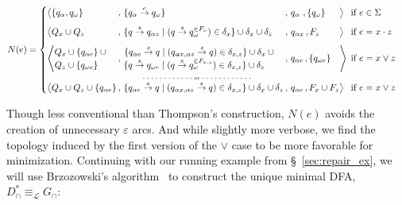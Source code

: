\documentclass[sigplan,review,acmsmall,nonacm,screen,anonymous]{acmart}\settopmatter{printfolios=false,printccs=false,printacmref=false}
\begin{document}
\begin{equation*}
N(e) =
\begin{cases}
  \begin{alignedat}{8}
    &\big\langle \{q_\alpha, q_\omega\}
    &&\,,\, \{ q_\alpha \overset{e}{\rightarrow} q_\omega \}
    &&\,,\, q_\alpha\,\,, \{q_{\omega}\}
    &&\big\rangle
    &&\:\: \text{if } e \in \Sigma \\[0.5em]

    &\big\langle Q_{x} \cup Q_{z}
    &&\,,\, \{ q \overset{s}{\rightarrow} q_{\alpha z} \mid (q \overset{s}{\rightarrow} q_{\omega}^{\in F_x}) \in \delta_x \} \cup \delta_{x} \cup \delta_{z}
    &&\,,\, q_{\alpha x}\,, F_{z}
    &&\big\rangle
    &&\:\: \text{if } e = x \cdot z \\[0.5em]

    &\Bigg\langle   \begin{matrix} Q_{x}\cup \{q_{\alpha e}\}\:\cup\\ Q_{z} \cup \{q_{\omega e}\}\phantom{\:\cup} \end{matrix}
    &&\,,\, \begin{matrix}\{ q_{\alpha e} \overset{s}{\rightarrow} q \mid (q_{\alpha x, \alpha z} \overset{s}{\rightarrow} q)\in \delta_{x, z} \} \cup \delta_{x}\:\cup\\
    \{ q \overset{s}{\rightarrow} q_{\omega e} \mid (q \overset{s}{\rightarrow} q_{\omega}^{\in F_{x,z}})\in \delta_{x, z} \}\cup \delta_{z}\phantom{\,\:\cup}\end{matrix}
    &&\,,\, q_{\alpha e}\,, \{q_{\omega e}\}
    &&\Bigg\rangle
    &&\:\:\text{if } e = x \lor z\hspace{-0.5cm}\\[-0.5em]
    \multicolumn{9}{c}{\tiny{\text{- - - - - - - - - - - - or - - - - - - - - - - - -}}} \\[-0.5em]
    &\big\langle Q_{x} \cup Q_{z} \cup \{q_{\alpha e}\}
    &&\,,\, \{ q_{\alpha e} \overset{s}{\rightarrow} q \mid (q_{\alpha x, \alpha z} \overset{s}{\rightarrow} q) \in \delta_{x, z} \}  \cup \delta_{x} \cup \delta_{z}
    &&\,,\, q_{\alpha e}\,, F_{x} \cup F_{z}
    &&\big\rangle
    &&\:\: \text{if } e = x \lor z
  \end{alignedat}
\end{cases}\vspace{0.2cm}
\end{equation*}

\noindent Though less conventional than Thompson's construction, $N(e)$ avoids the creation of unnecessary $\varepsilon$ arcs. And while slightly more verbose, we find the topology induced by the first version of the $\lor$ case to be more favorable for minimization. Continuing with our running example from \S~\ref{sec:repair_ex}, we will use Brzozowski's algorithm~\cite{brzozowski1962canonical} to construct the unique minimal DFA, $D^*_\cap \equiv_\mathcal{L} G_\cap$: \vspace{-0.4cm}
\end{document}

